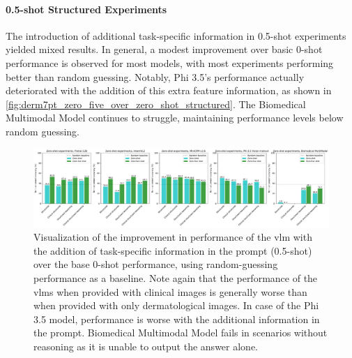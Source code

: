 \documentclass[../ShajiS_RnDReport.tex]{subfiles}
\begin{document}
\paragraph{0.5-shot Structured Experiments}
The introduction of additional task-specific information in 0.5-shot experiments yielded mixed results. In general, a modest improvement over basic 0-shot performance is observed for most models, with most experiments performing better than random guessing. Notably, Phi 3.5's performance actually deteriorated with the addition of this extra feature information, as shown in \autoref{fig:derm7pt_zero_five_over_zero_shot_structured}. The Biomedical Multimodal Model continues to struggle, maintaining performance levels below random guessing.

\begin{figure}[ht]
    \centering
    \includegraphics[width=\linewidth]{figures/derm7pt_zero_five_over_zero_shot_structured.pdf}
    \caption{Visualization of the improvement in performance of the \gls{vlm} with the addition of task-specific information in the prompt (0.5-shot) over the base 0-shot performance, using random-guessing performance as a baseline. Note again that the performance of the \glspl{vlm} when provided with clinical images is generally worse than when provided with only dermatological images. In case of the Phi 3.5 model, performance is worse with the additional information in the prompt. Biomedical Multimodal Model fails in scenarios without reasoning as it is unable to output the answer alone.}
    \label{fig:derm7pt_zero_five_over_zero_shot_structured}
\end{figure}
\end{document}
